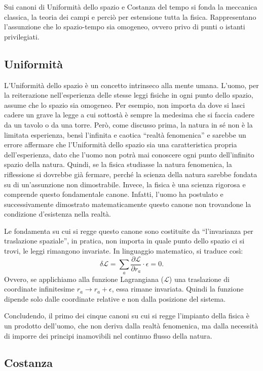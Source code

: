 \documentclass[11pt,a4paper]{article}
\begin{document}
Sui canoni di Uniformità dello spazio e Costanza del tempo si fonda la meccanica classica, la teoria dei campi e perciò per estensione tutta la fisica. Rappresentano l’assunzione che lo spazio-tempo sia omogeneo, ovvero privo di punti o istanti privilegiati. \subsection{Uniformità}

L’Uniformità dello spazio è un concetto intrinseco alla mente umana. L’uomo, per la reiterazione nell’esperienza delle stesse leggi fisiche in ogni punto dello spazio, assume che lo spazio sia omogeneo. Per esempio, non importa da dove si lasci cadere un grave la legge a cui sottostà è sempre la medesima che si faccia cadere da un tavolo o da una torre. Però, come discusso prima, la natura in sé non è la limitata esperienza, bensì l’infinita e caotica “realtà fenomenica” e sarebbe un errore affermare che l’Uniformità dello spazio sia una caratteristica propria dell’esperienza, dato che l’uomo non potrà mai conoscere ogni punto dell’infinito spazio della natura. Quindi, se la fisica studiasse la natura fenomenica, la riflessione si dovrebbe già fermare, perché la scienza della natura sarebbe fondata su di un’assunzione non dimostrabile. Invece, la fisica è una scienza rigorosa e comprende questo fondamentale canone. Infatti, l’uomo ha postulato e successivamente dimostrato matematicamente questo canone non trovandone la condizione d’esistenza nella realtà. 

Le fondamenta su cui si regge questo canone sono costituite da “l’invarianza per traslazione spaziale”, in pratica, non importa in quale punto dello spazio ci si trovi, le leggi rimangono invariate. In linguaggio matematico, si traduce così: \begin{equation}\delta\mathcal{L}=\sum_a\frac{\partial\mathcal{L}}{\partial r_a}\cdot\epsilon=0.\end{equation} Ovvero, se applichiamo alla funzione Lagrangiana ($\mathcal{L}$) una traslazione di coordinate infinitesime $r_a\rightarrow r_a+\epsilon$, essa rimane invariata. Quindi la funzione dipende solo dalle coordinate relative e non dalla posizione del sistema. 

Concludendo, il primo dei cinque canoni su cui si regge l’impianto della fisica è un prodotto dell’uomo, che non deriva dalla realtà fenomenica, ma dalla necessità di imporre dei principi inamovibili nel continuo flusso della natura. \subsection{Costanza}
\end{document}
